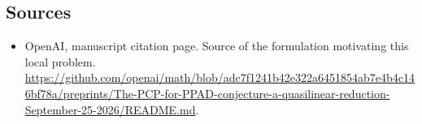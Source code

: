 \documentclass[11pt]{article}
\begin{document}
\subsection{Sources}
\begin{itemize}
\item[S1] OpenAI, manuscript citation page. Source of the formulation motivating this local problem.
\url{https://github.com/openai/math/blob/adc7f1241b42e322a6451854ab7e4b4c146bf78a/preprints/The-PCP-for-PPAD-conjecture-a-quasilinear-reduction-September-25-2026/README.md}.
\end{itemize}
\end{document}
